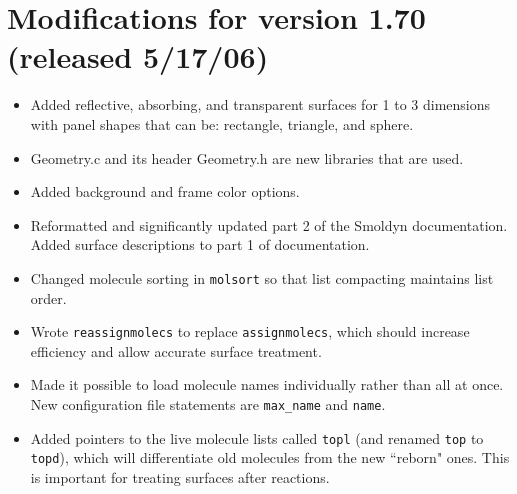 \documentclass {scrbook}
\newcommand {\ttt} {\texttt}
\begin{document}
\section{Modifications for version 1.70 (released 5/17/06)}
\begin{itemize}
\item Added reflective, absorbing, and transparent surfaces for 1 to 3 dimensions with panel shapes that can be: rectangle, triangle, and sphere.
\item Geometry.c and its header Geometry.h are new libraries that are used.
\item Added background and frame color options.
\item Reformatted and significantly updated part 2 of the Smoldyn documentation. Added surface descriptions to part 1 of documentation.
\item Changed molecule sorting in \ttt{molsort} so that list compacting maintains list order.
\item Wrote \ttt{reassignmolecs} to replace \ttt{assignmolecs}, which should increase efficiency and allow accurate surface treatment.
\item Made it possible to load molecule names individually rather than all at once. New configuration file statements are \ttt{max\_name} and \ttt{name}.
\item Added pointers to the live molecule lists called \ttt{topl} (and renamed \ttt{top} to \ttt{topd}), which will differentiate old molecules from the new ``reborn" ones. This is important for treating surfaces after reactions.
\end{itemize}
\end{document}
